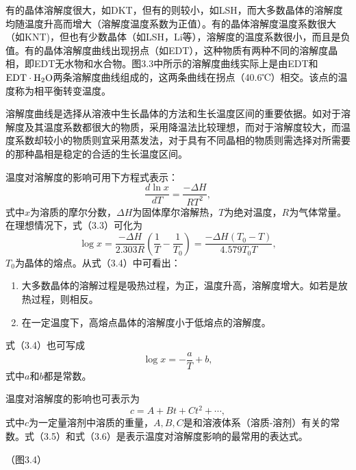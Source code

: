 有的晶体溶解度很大，如DKT，但有的则较小，如LSH，而大多数晶体的溶解度均随温度升高而增大（溶解度温度系数为正值）。有的晶体溶解度温度系数很大（如KNT)，但也有少数晶体（如LSH，Li等），溶解度的温度系数很小，而且是负值。有的晶体溶解度曲线出现拐点（如EDT），这种物质有两种不同的溶解度晶相，即EDT无水物和水合物。图3.3中所示的溶解度曲线实际上是由EDT和$\rm EDT\cdot H_2O$两条溶解度曲线组成的，这两条曲线在拐点（40.6℃）相交。该点的温度称为相平衡转变温度。

溶解度曲线是选择从溶液中生长晶体的方法和生长温度区间的重要依据。如对于溶解度及其温度系数都很大的物质，采用降温法比较理想，而对于溶解度较大，而温度系数却较小的物质则宜采用蒸发法，对于具有不同晶相的物质则需选择对所需要的那种晶相是稳定的合适的生长温度区间。

温度对溶解度的影响可用下方程式表示：
\begin{equation}
\frac{d\ln{x}}{dT}=\frac{-\Delta H}{RT^2},
\end{equation}
式中$x$为溶质的摩尔分数，$\Delta H$为固体摩尔溶解热，$T$为绝对温度，$R$为气体常量。在理想情况下，式（3.3）可化为
\begin{equation}
\log x=\frac{-\Delta H}{2.303R}\left( \frac{1}{T}-\frac{1}{T_0}\right) =\frac{-\Delta H(T_0-T)}{4.579T_0T},
\end{equation}
$T_0$为晶体的熔点。从式（3.4）中可看出：
\begin{enumerate}[(1)]\itemsep -0.5ex
\item 大多数晶体的溶解过程是吸热过程，为正，温度升高，溶解度增大。如若是放热过程，则相反。
\item 在一定温度下，高熔点晶体的溶解度小于低熔点的溶解度。
\end{enumerate}

式（3.4）也可写成
\begin{equation}
\log x = -\frac{a}{T} + b,
\end{equation}
式中$a$和$b$都是常数。

温度对溶解度的影响也可表示为
\begin{equation}
c=A+Bt+Ct^2+\cdots,
\end{equation}
式中$c$为一定量溶剂中溶质的重量，$A,B,C$是和溶液体系（溶质-溶剂）有关的常数。式（3.5）和式（3.6）是表示温度对溶解度影响的最常用的表达式。

（图3.4）


